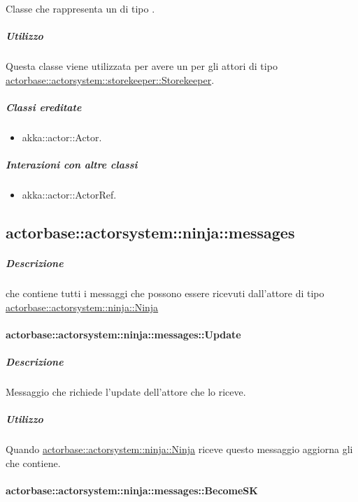 \documentclass{scalatekids-article}
\begin{document}
Classe che rappresenta un  di tipo .

\subparagraph{Utilizzo}

Questa classe viene utilizzata per avere un  per gli attori di tipo
\hyperref[sec:actorbase::actorsystem::storekeeper::Storekeeper]{actorbase::actorsystem::storekeeper::Storekeeper}.

\subparagraph{Classi ereditate}

\begin{itemize}

\item akka::actor::Actor.

\end{itemize}

\subparagraph{Interazioni con altre classi}

\begin{itemize}
\item akka::actor::ActorRef.
\end{itemize}

\subsection{actorbase::actorsystem::ninja::messages}
\label{sec:actorbase::actorsystem::ninja::messages}

\subparagraph{Descrizione}

 che contiene tutti i messaggi che possono essere ricevuti
dall'attore di tipo
\hyperref[sec:actorbase::actorsystem::ninja::Ninja]{actorbase::actorsystem::ninja::Ninja}

\paragraph{actorbase::actorsystem::ninja::messages::Update}
\label{sec:actorbase::actorsystem::ninja::messages::Update}

\subparagraph{Descrizione}

Messaggio che richiede l'update dell'attore che lo riceve.

\subparagraph{Utilizzo}

Quando \hyperref[sec:actorbase::actorsystem::ninja::Ninja]{actorbase::actorsystem::ninja::Ninja}
riceve questo messaggio aggiorna gli  che contiene.

\paragraph{actorbase::actorsystem::ninja::messages::BecomeSK}
\label{sec:actorbase::actorsystem::ninja::messages::BecomeSK}
\end{document}
